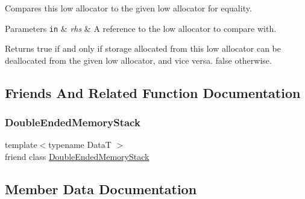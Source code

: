 Compares this low allocator to the given low allocator for equality.


\begin{DoxyParams}[1]{Parameters}
\mbox{\tt in}  & {\em rhs} & A reference to the low allocator to compare with. \\
\hline
\end{DoxyParams}
\begin{DoxyReturn}{Returns}
{\ttfamily true} if and only if storage allocated from this low allocator can be deallocated from the given low allocator, and vice versa. {\ttfamily false} otherwise. 
\end{DoxyReturn}


\subsection{Friends And Related Function Documentation}
\hypertarget{structmage_1_1_double_ended_memory_stack_1_1_low_allocator_a10ae729d55b8c0017057250445835680}{}\label{structmage_1_1_double_ended_memory_stack_1_1_low_allocator_a10ae729d55b8c0017057250445835680} 
\subsubsection{\texorpdfstring{Double\+Ended\+Memory\+Stack}{DoubleEndedMemoryStack}}
{\footnotesize\ttfamily template$<$typename DataT $>$ \\
friend class \hyperlink{classmage_1_1_double_ended_memory_stack}{Double\+Ended\+Memory\+Stack}\hspace{0.3cm}{\ttfamily [friend]}}



\subsection{Member Data Documentation}
\hypertarget{structmage_1_1_double_ended_memory_stack_1_1_low_allocator_a2162e2789f0add4d7a9aac5408c1e7d5}{}\label{structmage_1_1_double_ended_memory_stack_1_1_low_allocator_a2162e2789f0add4d7a9aac5408c1e7d5} 
